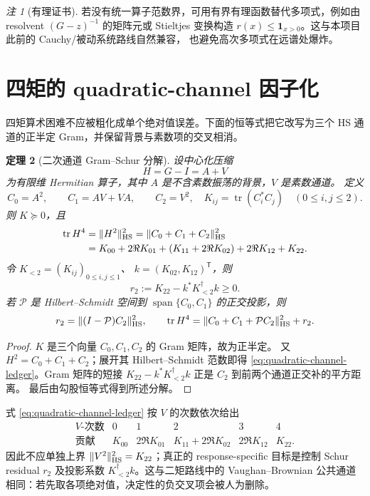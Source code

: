 \documentclass[UTF8,11pt,a4paper]{ctexart}
\newtheorem{theorem}{定理}[section]
\theoremstyle{definition}
\theoremstyle{remark}
\newtheorem{remark}[theorem]{注}
\newcommand{\tr}{\operatorname{tr}}
\begin{document}
\begin{remark}[有理证书]
若没有统一算子范数界，可用有界有理函数替代多项式，例如由 resolvent
$(G-z)^{-1}$ 的矩阵元或 Stieltjes 变换构造
$r(x)\le\mathbf1_{x>0}$。这与本项目此前的 Cauchy/被动系统路线自然兼容，
也避免高次多项式在远谱处爆炸。
\end{remark}

\section{四矩的 quadratic-channel 因子化}

四矩算术困难不应被粗化成单个绝对值误差。下面的恒等式把它改写为三个
HS 通道的正半定 Gram，并保留背景与素数项的交叉相消。

\begin{theorem}[二次通道 Gram--Schur 分解]\label{thm:quadratic-channel}
设中心化压缩
\[
 H=G-I=A+V
\]
为有限维 Hermitian 算子，其中 $A$ 是不含素数振荡的背景，$V$ 是素数通道。
定义
\[
 C_0=A^2,\qquad C_1=AV+VA,\qquad C_2=V^2,
\quad
 K_{ij}=\tr(C_i^*C_j)\quad(0\le i,j\le2).
\]
则 $K\succeq0$，且
\begin{align}
 \tr H^4
 &=\|H^2\|_{\rm HS}^2
 =\|C_0+C_1+C_2\|_{\rm HS}^2 \notag\\
 &=K_{00}+2\Re K_{01}
   +(K_{11}+2\Re K_{02})+2\Re K_{12}+K_{22}.
 \label{eq:quadratic-channel-ledger}
\end{align}
令 $K_{<2}=(K_{ij})_{0\le i,j\le1}$、
$k=(K_{02},K_{12})^{\mathsf T}$，则
\[
 r_2:=K_{22}-k^*K_{<2}^{\dagger}k\ge0.
\]
若 $\mathcal P$ 是 Hilbert--Schmidt 空间到
$\operatorname{span}\{C_0,C_1\}$ 的正交投影，则
\[
 r_2=\|(I-\mathcal P)C_2\|_{\rm HS}^2,\qquad
 \tr H^4=\|C_0+C_1+\mathcal PC_2\|_{\rm HS}^2+r_2.
\]
\end{theorem}

\begin{proof}
$K$ 是三个向量 $C_0,C_1,C_2$ 的 Gram 矩阵，故为正半定。
又 $H^2=C_0+C_1+C_2$；展开其 Hilbert--Schmidt 范数即得
\eqref{eq:quadratic-channel-ledger}。Gram 矩阵的短接
$K_{22}-k^*K_{<2}^{\dagger}k$ 正是 $C_2$ 到前两个通道正交补的平方距离。
最后由勾股恒等式得到所述分解。
\end{proof}

式 \eqref{eq:quadratic-channel-ledger} 按 $V$ 的次数依次给出
\[
\begin{array}{c|ccccc}
\text{$V$-次数}&0&1&2&3&4\\ \hline
\text{贡献}&K_{00}&2\Re K_{01}&K_{11}+2\Re K_{02}
&2\Re K_{12}&K_{22}.
\end{array}
\]
因此不应单独上界 $\|V^2\|_{\rm HS}^2=K_{22}$；真正的 response-specific
目标是控制 Schur residual $r_2$ 及投影系数
$K_{<2}^{\dagger}k$。这与二矩路线中的 Vaughan--Brownian
公共通道相同：若先取各项绝对值，决定性的负交叉项会被人为删除。
\end{document}
